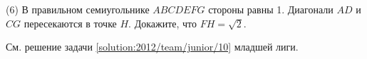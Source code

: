 \textsf{(6)}
В правильном семиугольнике $ABCDEFG$ стороны равны 1.
Диагонали $AD$ и $CG$ пересекаются в точке $H$.
Докажите, что $FH = \sqrt{2}$.

\solution
См. решение задачи \ref{solution:2012/team/junior/10} младшей лиги.

